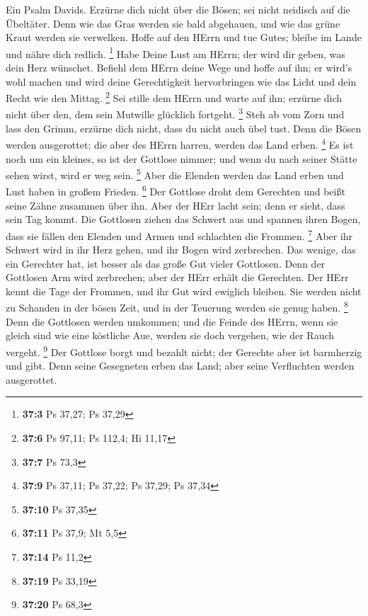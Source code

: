  Ein Psalm Davids. Erzürne dich nicht über die Bösen; sei
nicht neidisch auf die Übeltäter.  Denn wie das Gras
werden sie bald abgehauen, und wie das grüne Kraut werden sie verwelken.
 Hoffe auf den HErrn und tue Gutes; bleibe im Lande und
nähre dich redlich. \footnote{\textbf{37:3} Ps 37,27; Ps 37,29}
 Habe Deine Lust am HErrn; der wird dir geben, was dein
Herz wünschet.  Befiehl dem HErrn deine Wege und hoffe auf
ihn; er wird's wohl machen  und wird deine Gerechtigkeit
hervorbringen wie das Licht und dein Recht wie den Mittag. \footnote{\textbf{37:6}
  Ps 97,11; Ps 112,4; Hi 11,17}  Sei stille dem HErrn und
warte auf ihn; erzürne dich nicht über den, dem sein Mutwille glücklich
fortgeht. \footnote{\textbf{37:7} Ps 73,3}  Steh ab vom
Zorn und lass den Grimm, erzürne dich nicht, dass du nicht auch übel
tust.  Denn die Bösen werden ausgerottet; die aber des
HErrn harren, werden das Land erben. \footnote{\textbf{37:9} Ps 37,11;
  Ps 37,22; Ps 37,29; Ps 37,34}  Es ist noch um ein
kleines, so ist der Gottlose nimmer; und wenn du nach seiner Stätte
sehen wirst, wird er weg sein. \footnote{\textbf{37:10} Ps 37,35}
 Aber die Elenden werden das Land erben und Lust haben in
großem Frieden. \footnote{\textbf{37:11} Ps 37,9; Mt 5,5}
 Der Gottlose droht dem Gerechten und beißt seine Zähne
zusammen über ihn.  Aber der HErr lacht sein; denn er
sieht, dass sein Tag kommt.  Die Gottlosen ziehen das
Schwert aus und spannen ihren Bogen, dass sie fällen den Elenden und
Armen und schlachten die Frommen. \footnote{\textbf{37:14} Ps 11,2}
 Aber ihr Schwert wird in ihr Herz gehen, und ihr Bogen
wird zerbrechen.  Das wenige, das ein Gerechter hat, ist
besser als das große Gut vieler Gottlosen.  Denn der
Gottlosen Arm wird zerbrechen; aber der HErr erhält die Gerechten.
 Der HErr kennt die Tage der Frommen, und ihr Gut wird
ewiglich bleiben.  Sie werden nicht zu Schanden in der
bösen Zeit, und in der Teuerung werden sie genug haben. \footnote{\textbf{37:19}
  Ps 33,19}  Denn die Gottlosen werden umkommen; und die
Feinde des HErrn, wenn sie gleich sind wie eine köstliche Aue, werden
sie doch vergehen, wie der Rauch vergeht. \footnote{\textbf{37:20} Ps
  68,3}  Der Gottlose borgt und bezahlt nicht; der
Gerechte aber ist barmherzig und gibt.  Denn seine
Gesegneten erben das Land; aber seine Verfluchten werden ausgerottet.
